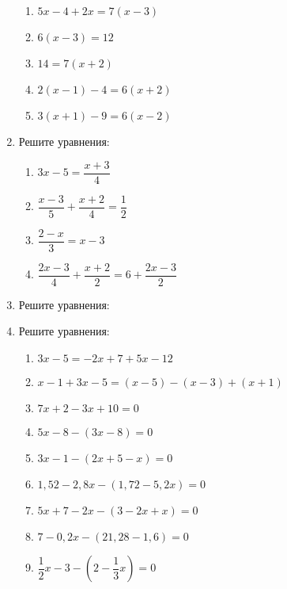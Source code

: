 \documentclass[12pt, a4paper]{article}
\begin{document}
\begin{enumerate}
\begin{multicols}{2}
\begin{enumerate}[label=\asbuk*)]
			\item $5x-4+2x=7(x-3)$
			\item $6(x-3)=12$
			\item $14=7(x+2)$
			\item $2(x-1)-4=6(x+2)$
			\item $3(x+1)-9=6(x-2)$
		\end{enumerate}
	\end{multicols}
	\item Решите уравнения:
	\begin{multicols}{2}
		\begin{enumerate}[label=\asbuk*)]
			\item $3x-5=\dfrac{x+3}{4}$
			\item $\dfrac{x-3}{5}+\dfrac{x+2}{4}=\dfrac{1}{2}$
			\item $\dfrac{2-x}{3}=x-3$
			\item $\dfrac{2x-3}{4}+\dfrac{x+2}{2}=6+\dfrac{2x-3}{2}$
		\end{enumerate}
	\end{multicols}
	\item Решите уравнения:
	\begin{enumerate}[label=\asbuk*)]
	\end{enumerate}
	\item Решите уравнения:
	\begin{enumerate}[label=\asbuk*)]
		\item $3x-5=-2x+7+5x-12$
		\item $x-1+3x-5=(x-5)-(x-3)+(x+1)$
		\item $7x+2-3x+10=0$
		\item $5x-8-(3x-8)=0$
		\item $3x-1-(2x+5-x)=0$
		\item $1,52-2,8x-(1,72-5,2x)=0$
		\item $5x+7-2x-(3-2x+x)=0$
		\item $7-0,2x-(21,28-1,6)=0$
		\item $\dfrac{1}{2}x-3-\left(2-\dfrac{1}{3}x\right)=0$

\end{enumerate}
\end{enumerate}
\end{document}
